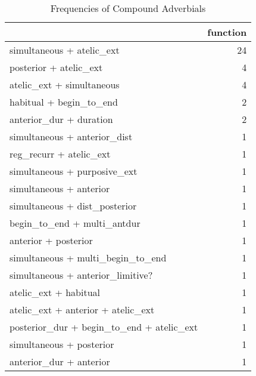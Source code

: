 \begin{table}[htbp!]
\centering
\caption{Frequencies of Compound Adverbials}
\label{table:multi_ct}
\begin{tabular}{lr}
\toprule
{} &  function \\
\midrule
simultaneous + atelic\_ext                 &        24 \\
posterior + atelic\_ext                    &         4 \\
atelic\_ext + simultaneous                 &         4 \\
habitual + begin\_to\_end                   &         2 \\
anterior\_dur + duration                   &         2 \\
simultaneous + anterior\_dist              &         1 \\
reg\_recurr + atelic\_ext                   &         1 \\
simultaneous + purposive\_ext              &         1 \\
simultaneous + anterior                   &         1 \\
simultaneous + dist\_posterior             &         1 \\
begin\_to\_end + multi\_antdur               &         1 \\
anterior + posterior                      &         1 \\
simultaneous + multi\_begin\_to\_end         &         1 \\
simultaneous + anterior\_limitive?         &         1 \\
atelic\_ext + habitual                     &         1 \\
atelic\_ext + anterior + atelic\_ext        &         1 \\
posterior\_dur + begin\_to\_end + atelic\_ext &         1 \\
simultaneous + posterior                  &         1 \\
anterior\_dur + anterior                   &         1 \\
\bottomrule
\end{tabular}
\end{table}

